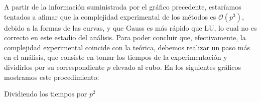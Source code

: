 A partir de la información suministrada por el gráfico precedente, estaríamos tentados a afimar que la complejidad experimental de los métodos es $\mathcal{O}(p^3)$,
debido a la formas de las curvas, y que Gauss es más rápido que LU, lo cual no es correcto en este estadio del análisis. Para poder concluir que, efectivamente, la complejidad experimental coincide con
la teórica, debemos realizar un paso más en el análisis, que consiste en tomar los tiempos de la experimentación y dividirlos por su correspondiente $p$ elevado al cubo.
\newline
\newline
En los siguientes gráficos mostramos este procedimiento:
\begin{center}

    \caption{Dividiendo los tiempos por $p^2$}
\end{center}

